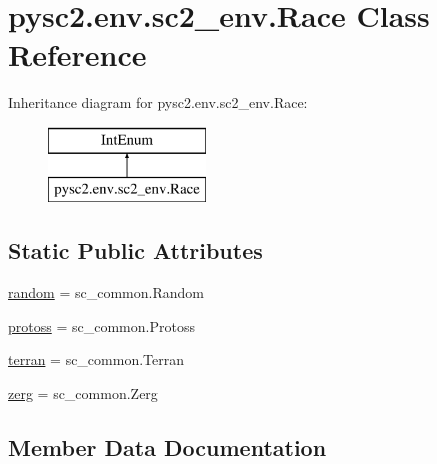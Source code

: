 \hypertarget{classpysc2_1_1env_1_1sc2__env_1_1_race}{}\section{pysc2.\+env.\+sc2\+\_\+env.\+Race Class Reference}
\label{classpysc2_1_1env_1_1sc2__env_1_1_race}
Inheritance diagram for pysc2.\+env.\+sc2\+\_\+env.\+Race\+:\begin{figure}[H]
\begin{center}
\leavevmode
\includegraphics[height=2.000000cm]{classpysc2_1_1env_1_1sc2__env_1_1_race}
\end{center}
\end{figure}
\subsection*{Static Public Attributes}
\begin{DoxyCompactItemize}
\item 
\mbox{\hyperlink{classpysc2_1_1env_1_1sc2__env_1_1_race_ab851a3d93680aa43b949758da07fbc62}{random}} = sc\+\_\+common.\+Random
\item 
\mbox{\hyperlink{classpysc2_1_1env_1_1sc2__env_1_1_race_af22cda726ad62f0bcba391d939dd74a5}{protoss}} = sc\+\_\+common.\+Protoss
\item 
\mbox{\hyperlink{classpysc2_1_1env_1_1sc2__env_1_1_race_a90ad58fb22ec0d6d3ac1c84f0aa91eac}{terran}} = sc\+\_\+common.\+Terran
\item 
\mbox{\hyperlink{classpysc2_1_1env_1_1sc2__env_1_1_race_a8caa8074e5a1e10d7ec21d141274e76a}{zerg}} = sc\+\_\+common.\+Zerg
\end{DoxyCompactItemize}


\subsection{Member Data Documentation}
\mbox{\label{classpysc2_1_1env_1_1sc2__env_1_1_race_af22cda726ad62f0bcba391d939dd74a5}} 
